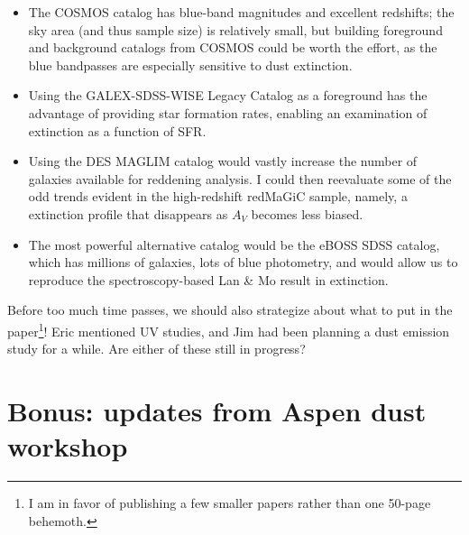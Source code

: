 \documentclass[11pt, oneside]{article}   	%
\begin{document}
\begin{itemize}
\item The COSMOS catalog has blue-band magnitudes and excellent redshifts; the sky area (and thus sample size) is relatively small, but building foreground and background catalogs from COSMOS could be worth the effort, as the blue bandpasses are especially sensitive to dust extinction. 
\item Using the GALEX-SDSS-WISE Legacy Catalog as a foreground has the advantage of providing star formation rates, enabling an examination of extinction as a function of SFR. 
\item Using the DES MAGLIM catalog would vastly increase the number of galaxies available for reddening analysis. I could then reevaluate some of the odd trends evident in the high-redshift redMaGiC sample, namely, a extinction profile that disappears as $A_V$ becomes less biased.
\item The most powerful alternative catalog would be the eBOSS SDSS catalog, which has millions of galaxies, lots of blue photometry, and would allow us to reproduce the spectroscopy-based Lan \& Mo result in extinction. 
\end{itemize} 

Before too much time passes, we should also strategize about what to put in the paper\footnote{I am in favor of publishing a few smaller papers rather than one 50-page behemoth.}! Eric mentioned UV studies, and Jim had been planning a dust emission study for a while. Are either of these still in progress? 



\section{Bonus: updates from Aspen dust workshop}\label{sec:aspen}
\end{document}
